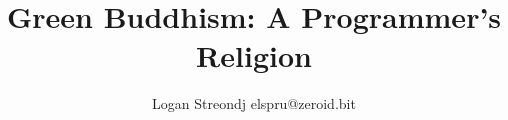 \documentclass{report}
\title{Green Buddhism: A Programmer's Religion}
\author{Logan Streondj elspru@zeroid.bit}
\begin{document}
\maketitle


\printbibliography{}
\label{bibliography}
\end{document}

